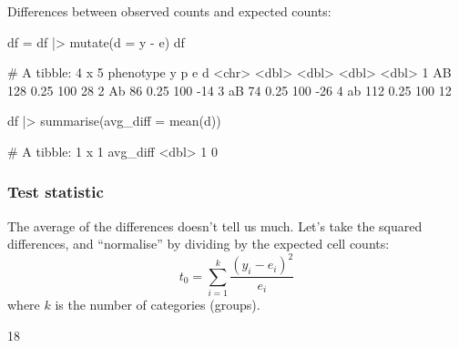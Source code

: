 \documentclass[a4paper]{article}\usepackage[]{graphicx}\usepackage[]{xcolor}
\begin{document}
Differences between observed counts and expected counts:
\begin{Schunk}
\begin{Sinput}
df = df |>
  mutate(d = y - e)
df
\end{Sinput}
\begin{Soutput}
# A tibble: 4 x 5
  phenotype     y     p     e     d
  <chr>     <dbl> <dbl> <dbl> <dbl>
1 AB          128  0.25   100    28
2 Ab           86  0.25   100   -14
3 aB           74  0.25   100   -26
4 ab          112  0.25   100    12
\end{Soutput}
\begin{Sinput}
df |>
	summarise(avg_diff = mean(d))
\end{Sinput}
\begin{Soutput}
# A tibble: 1 x 1
  avg_diff
     <dbl>
1        0
\end{Soutput}
\end{Schunk}
\subsubsection{Test statistic}
The average of the differences doesn't tell us much. Let's take the squared differences, and ``normalise'' by dividing by the expected cell counts:
\[
	t_0 = \sum_{i=1}^{k} \frac{(y_i - e_i)^2}{e_i}
\]
where \( k \) is the number of categories (groups).
\begin{Schunk}
\begin{Soutput}
[1] 18
\end{Soutput}
\end{Schunk}
\end{document}
